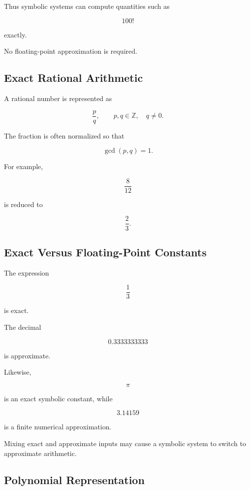 Thus symbolic systems can compute quantities such as

\[
\boxed{
100!
}
\]

exactly.

No floating-point approximation is required.

\subsection{Exact Rational Arithmetic}
\label{subsec:exact-rational-arithmetic}

A rational number is represented as

\[
\boxed{
\frac{p}{q},
\qquad
p,q\in\mathbb{Z},
\quad
q\neq0.
}
\]

The fraction is often normalized so that

\[
\gcd(p,q)=1.
\]

For example,

\[
\frac{8}{12}
\]

is reduced to

\[
\boxed{
\frac23.
}
\]

\subsection{Exact Versus Floating-Point Constants}
\label{subsec:exact-vs-floating-constants}

The expression

\[
\boxed{
\frac13
}
\]

is exact.

The decimal

\[
\boxed{
0.3333333333
}
\]

is approximate.

Likewise,

\[
\boxed{
\pi
}
\]

is an exact symbolic constant, while

\[
\boxed{
3.14159
}
\]

is a finite numerical approximation.

Mixing exact and approximate inputs may cause a symbolic system to switch
to approximate arithmetic.

\subsection{Polynomial Representation}
\label{subsec:symbolic-polynomial-representation}

